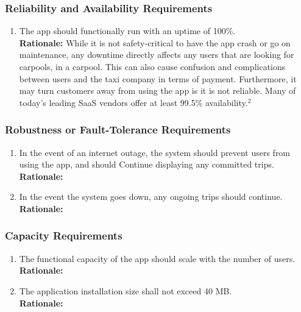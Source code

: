 \documentclass[]{article}
\begin{document}
\subsubsection{Reliability and Availability Requirements}
\label{ssub:reliability_and_availability_requirements}
\begin{enumerate}[{PR-RA}1. ]
	\item The app should functionally run with an uptime of 100\%.\\
	{\bf Rationale:} While it is not safety-critical to have the app crash or go on maintenance, any downtime directly affects any users that are looking for carpools, in a carpool. This can also cause confusion and complications between users and the taxi company in terms of payment. Furthermore, it may turn customers away from using the app is it is not reliable. Many of today's leading SaaS vendors offer at least 99.5\% availability.$^2$
\end{enumerate}

\subsubsection{Robustness or Fault-Tolerance Requirements}
\label{ssub:robustness_or_fault_tolerance_requirements}
\begin{enumerate}[{PR-RFT}1. ]
	\item In the event of an internet outage, the system should prevent users from using the app, and should Continue displaying any committed trips.\\
	{\bf Rationale:} 
	\item In the event the system goes down, any ongoing trips should continue.\\
	{\bf Rationale:} 
\end{enumerate}

\subsubsection{Capacity Requirements}
\label{ssub:capacity_requirements}
\begin{enumerate}[{PR-C}1. ]
	\item The functional capacity of the app should scale with the number of users.\\
	{\bf Rationale:} 
	\item The application installation size shall not exceed 40 MB.\\
	{\bf Rationale:} 
\end{enumerate}
\end{document}

